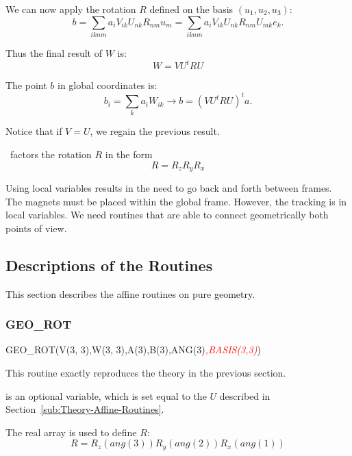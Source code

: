 We can now apply the rotation $R$ defined on the basis $(u_1,u_2,u_3)$:
\begin{equation*}
  b = \sum_{iknm} a_i V_{ik} U_{nk} R_{nm} u_m
    = \sum_{iknm} a_i V_{ik} U_{nk} R_{nm} U_{mk} e_k.
\end{equation*}

Thus the final result of $W$ is:
\begin{equation*}
  W = VU^t RU
\end{equation*}

The point $b$ in global coordinates is:
\begin{equation*}
  b_i = \sum_k a_i W_{ik}
  \rightarrow b = (VU^t RU)^t a.
\end{equation*}

Notice that if $V=U$, we regain the previous result.

\PTC\ factors the rotation $R$ in the form
\begin{equation*}
  R = R_z R_y R_x
\end{equation*}

Using local variables results in the need to go back and forth between frames.
The magnets must be placed within the global frame. However, the tracking is
in local variables. We need routines that are able to connect geometrically
both points of view.


\subsection{Descriptions of the Routines}

This section describes the affine routines on pure geometry.


\subsubsection{GEO_ROT}

\begin{ptccode}
GEO_ROT(V(3, 3),W(3, 3),A(3),B(3),ANG(3)\textit{\textcolor{red}{,BASIS(3,3)}})
\end{ptccode}

%
This routine exactly reproduces the theory in the previous section.

 is an optional variable, which is set equal to the $U$ described
in Section~\ref{sub:Theory-Affine-Routines}.

The real array  is used to define $R$:
\begin{equation*}
R = R_z (ang(3)) R_y (ang(2)) R_x (ang(1))
\end{equation*}

